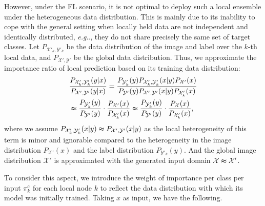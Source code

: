 \documentclass[letterpaper]{article} %
\makeatletter
\DeclareRobustCommand\onedot{\futurelet\@let@token\@onedot}
\def\@onedot{\ifx\@let@token.\else.\null\fi\xspace}
\def\eg{\emph{e.g}\onedot} \def\Eg{\emph{E.g}\onedot}
\newcommand{\domx}{\mathcal{X}}
\newcommand{\domy}{\mathcal{Y}}
\makeatother
\begin{document}
However, under the FL scenario, it is not optimal to deploy such a local ensemble under the heterogeneous data distribution. This is mainly due to its inability to cope with the general setting when locally held data are not independent and identically distributed, \eg, they do not share precisely the same set of target classes.
Let $P_{\domx'_k, \domy'_k}$ be the data distribution of the image and label over the $k$-th local data, and $P_{\domx', \domy'}$ be the global data distribution. Thus, we approximate the importance ratio of local prediction based on its training data distribution:
\begin{equation}
\label{eq:bias}
\begin{aligned}
    & \frac{P_{\domx'_k, \domy'_k}(y|x)}{P_{\domx', \domy'}(y|x)} = \frac{P_{\domy'_k}(y) P_{\domx'_k, \domy'_k}(x|y) P_{\domx'}(x)}{P_{\domy'}(y) P_{\domx', \domy'}(x|y) P_{\domx'_k}(x)} \\
    & \thickapprox  \frac{P_{\domy'_k}(y)}{P_{\domy'}(y)} \cdot \frac{P_{\domx'}(x)}{P_{\domx'_k}(x)} \thickapprox  \frac{P_{\domy'_k}(y)}{P_{\domy'}(y)} \cdot \frac{P_{\domx}(x)}{P_{\domx'_k}(x)} ,
\end{aligned}
\end{equation}
where we assume $P_{\domx'_k, \domy'_k}(x|y) \thickapprox  P_{\domx', \domy'}(x|y)$ as the local heterogeneity of this term is minor and ignorable compared to the heterogeneity in the image distribution $P_{\domx'}(x)$ and the label distribution $P_{\domy'_k}(y)$. And the global image distribution $\domx'$ is approximated with the generated input domain $\domx \thickapprox \domx'$.

To consider this aspect, we introduce the weight of importance per class per input $\pi_k^c$ for each local node $k$ to reflect the data distribution with which its model was initially trained. Taking $x$ as input, we have the following.
\end{document}
